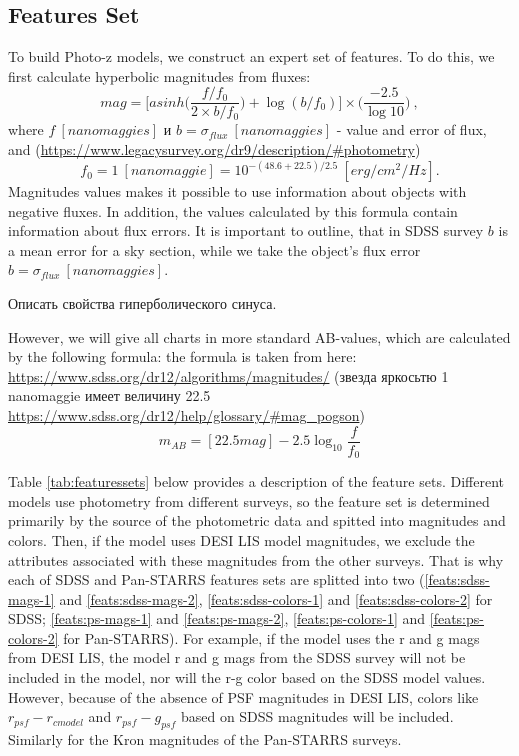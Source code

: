 \documentclass[fleqn,usenatbib]{mnras}
\begin{document}
\subsection{Features Set}
To build Photo-z models, we construct an expert set of features. To do this, we first calculate hyperbolic magnitudes from fluxes:
\begin{equation}\label{eq:asinhmag}
    mag = \Bigg[asinh\Bigg(\frac{f/f_0}{2 \times b/f_0}\Bigg) + \log(b/f_0)\Bigg] \times \Bigg(\frac{-2.5}{\log 10}\Bigg) ~,
\end{equation}
where $f~[nanomaggies]$ и $b = \sigma_{flux}~[nanomaggies]$ - value and error of flux, and (\url{https://www.legacysurvey.org/dr9/description/#photometry})
\begin{equation}
    f_0 = 1~[nanomaggie] = 10^{-(48.6+22.5)/2.5}~[erg/cm^2/Hz].
\end{equation}
Magnitudes values makes it possible to use information about objects with negative fluxes. In addition, the values calculated by this formula contain information about flux errors. It is important to outline, that in SDSS survey $b$ is a mean error for a sky section, while we take the object's flux error $b = \sigma_{flux}~[nanomaggies]$.

Описать свойства гиперболического синуса.

However, we will give all charts in more standard AB-values, which are calculated by the following formula: the formula is taken from here: \url{https://www.sdss.org/dr12/algorithms/magnitudes/} (звезда яркосьтю 1 nanomaggie имеет величину 22.5 \url{https://www.sdss.org/dr12/help/glossary/#mag_pogson})
\begin{equation}\label{eq:mag_ab}
    m_{AB} = [22.5 mag] - 2.5 \log_{10} \frac{f}{f_0}
\end{equation}

Table \ref{tab:featuressets} below provides a description of the feature sets. Different models use photometry from different surveys, so the feature set is determined primarily by the source of the photometric data and spitted into magnitudes and colors. Then, if the model uses DESI LIS model magnitudes, we exclude the attributes associated with these magnitudes from the other surveys. That is why each of SDSS and Pan-STARRS features sets are splitted into two (\ref{feats:sdss-mags-1} and \ref{feats:sdss-mags-2}, \ref{feats:sdss-colors-1} and \ref{feats:sdss-colors-2} for SDSS; \ref{feats:ps-mags-1} and \ref{feats:ps-mags-2}, \ref{feats:ps-colors-1} and \ref{feats:ps-colors-2} for Pan-STARRS). For example, if the model uses the r and g mags from DESI LIS, the model r and g mags from the SDSS survey will not be included in the model, nor will the r-g color based on the SDSS model values. However, because of the absence of PSF magnitudes in DESI LIS, colors like $r_{psf} - r_{cmodel}$ and $r_{psf} - g_{psf}$ based on SDSS magnitudes will be included. Similarly for the Kron magnitudes of the Pan-STARRS surveys.
\end{document}
